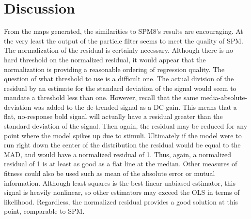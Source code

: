 \section{Discussion}
From the maps generated, the similarities to SPM8's results are encouraging. At the 
very least the output of the particle filter seems to meet the quality of SPM. The normalization
of the residual is certainly necessary. Although there is no hard threshold on the 
normalized residual, it would appear that the normalization is providing a reasonable
ordering of regression quality. The question of what threshold to use is a difficult one.
The actual division of the residual by an estimate for the standard deviation
of the signal would seem to mandate a threshold less than one. However, recall that the 
same media-absolute-deviation was added to the de-trended signal as a DC-gain. This means
that a flat, no-response bold signal will actually have a residual greater than the standard 
deviation of the signal. Then again, the residual may be reduced for any point where the 
model spikes up due to stimuli. Ultimately if the model were to run right down the 
center of the distribution the residual would be equal to the MAD, and would have a 
normalized residual of 1. Thus, again, a normalized residual of 1 is at least as 
good as a flat line at the median. 
Other measures of fitness could also be used such as mean of the absolute error or 
mutual information. Although least squares is the best linear unbiased estimator,
this signal is heavily nonlinear, so other estimators may exceed the OLS in terms
of likelihood. Regardless, the normalized residual provides a good solution at this
point, comparable to SPM.

